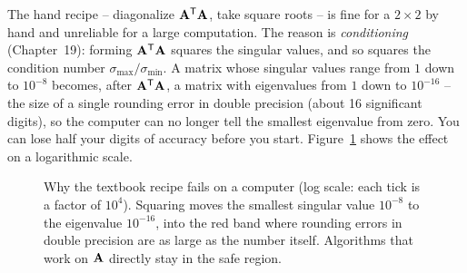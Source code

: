The hand recipe -- diagonalize $\mathbf{A}^{\mathsf{T}}\mathbf{A}$, take square roots -- is fine
for a $2\times 2$ by hand and unreliable for a large computation. The reason is
\emph{conditioning} (Chapter~19): forming $\mathbf{A}^{\mathsf{T}}\mathbf{A}$ squares the
singular values, and so squares the condition number
$\sigma_{\max}/\sigma_{\min}$. A matrix whose singular values range from $1$ down to
$10^{-8}$ becomes, after $\mathbf{A}^{\mathsf{T}}\mathbf{A}$, a matrix with eigenvalues from $1$
down to $10^{-16}$ -- the size of a single rounding error in double precision
(about 16 significant digits), so the computer can no longer tell the smallest
eigenvalue from zero. You can lose half your digits of accuracy before you start.
Figure~\ref{ch29:fig-conditioning} shows the effect on a logarithmic scale.

\begin{figure}[H]
\centering
{}
\caption{Why the textbook recipe fails on a computer (log scale: each tick is a
factor of $10^4$). Squaring moves the smallest singular value $10^{-8}$ to the
eigenvalue $10^{-16}$, into the red band where rounding errors in double
precision are as large as the number itself. Algorithms that work on $\mathbf{A}$
directly stay in the safe region.}
\label{ch29:fig-conditioning}
\end{figure}

